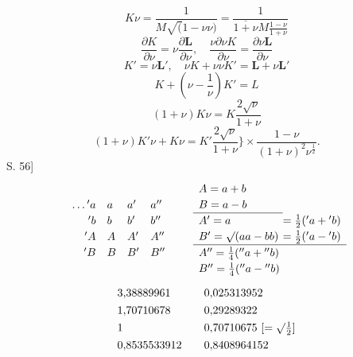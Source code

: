 \begin{equation}\tag*{[35]}K\nu=\frac1{M\surd(1-\nu\nu)}=\frac1{\overline{1+\nu}M\frac{1-\nu}{1+\nu}}\end{equation}
\begin{equation}\tag*{[36]}\frac{\partial K}{\partial\nu}=\nu\frac{\partial\mathbf L}{\partial\nu},\quad\frac{\nu\partial\nu K}{\partial\nu}=\frac{\partial\nu\mathbf L}{\partial\nu}\end{equation}
\begin{equation}\tag*{[37]}K'=\nu\mathbf L',\quad\nu K+\nu\nu K'=\mathbf L+\nu\mathbf L'\end{equation}
\begin{equation}\tag*{[38]}K+\left(\nu-\frac1\nu\right)K'=L\end{equation}
\begin{equation}\tag*{[39]}(1+\nu)K\nu=K\frac{2\sqrt\nu}{1+\nu}\end{equation}
\begin{equation}\tag*{[40]}(1+\nu)K'\nu+K\nu=K'\frac{2\sqrt\nu}{1+\nu}\Big\}\times\frac{1-\nu}{(1+\nu)^2\nu^{\frac12}}.\end{equation}
\noindent S. 56]
\[\renewcommand{\arraystretch}{1.2}\begin{array}{r@{\quad}l@{\quad}l@{\quad}l}
\ldots{}'a&a&a'&a''\\
{}'b&b&b'&b''\\
{}'A&A&A'&A''\\
{}'B&B&B'&B''
\end{array}\qquad\begin{array}{l@{\;}l}
A=a+b&\\
B=a-b&\\\cline{1-1}
A'=a&=\tfrac12({}'a+{}'b)\\
B'=\surd(aa-bb)&=\tfrac12({}'a-{}'b)\\\hline
A''=\tfrac14({}''a+{}''b)&\\
B''=\tfrac14({}''a-{}''b)&
\end{array}\]
\[\renewcommand{\arraystretch}{1.3}\begin{array}{l@{\qquad}l}
3{,}38889961&0{,}025313952\\
1{,}70710678&0{,}29289322\\
1&0{,}70710675\ [=\surd\tfrac12]\\
0{,}8535533912&0{,}8408964152
\end{array}\]
\ClosingRule
\clearpage
\endgroup
